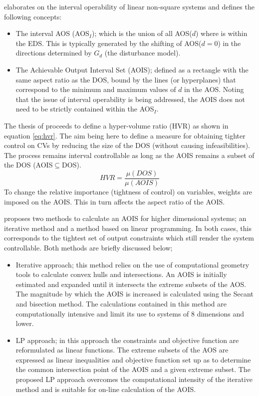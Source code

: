 \citet{limaphd} elaborates on the interval operability of linear non-square systems and defines the following concepts:
\begin{itemize}
  \item The interval AOS (AOS$_I$); which is the union of all AOS($d$) where is within the EDS. 
This is typically generated by the shifting of AOS($d=0$) in the directions determined by $G_d$ (the disturbance model).
  \item The Achievable Output Interval Set (AOIS); defined as a rectangle with the same aspect ratio as the DOS, bound by the lines (or hyperplanes) that correspond to the minimum and maximum values of $d$ in the AOS. 
Noting that the issue of interval operability is being addressed, the AOIS does not need to be strictly contained within the AOS$_I$.
\end{itemize}
The thesis of \citet{limaphd} proceeds to define a hyper-volume ratio (HVR) as shown in equation \ref{eq:hvr}. 
The aim being here to define a measure for obtaining tighter control on CVs by reducing the size of the DOS (without causing infeasibilities). 
The process remains interval controllable as long as the AOIS remains a subset of the DOS (AOIS$\subseteq$DOS).
\begin{equation}
  \label{eq:hvr}
    HVR = \frac{\mu(DOS)}{\mu(AOIS)}
\end{equation}
To change the relative importance (tightness of control) on variables, weights are imposed on the AOIS. 
This in turn affects the aspect ratio of the AOIS.

\citet{limaphd} proposes two methods to calculate an AOIS for higher dimensional systems; an iterative method and a method based on linear programming. 
In both cases, this corresponds to the tightest set of output constraints which still render the system controllable. 
Both methods are briefly discussed below;
\begin{itemize}
  \item Iterative approach; this method relies on the use of computational geometry tools to calculate convex hulls and intersections. 
An AOIS is initially estimated and expanded until it intersects the extreme subsets of the AOS. 
The magnitude by which the AOIS is increased is calculated using the Secant and bisection method. 
The calculations contained in this method are computationally intensive and limit its use to systems of 8 dimensions and lower.
  \item LP approach; in this approach the constraints and objective function are reformulated as linear functions. 
The extreme subsets of the AOS are expressed as linear inequalities and objective function set up as to determine the common intersection point of the AOIS and a given extreme subset. 
The proposed LP approach overcomes the computational intensity of the iterative method and is suitable for on-line calculation of the AOIS.
\end{itemize}

